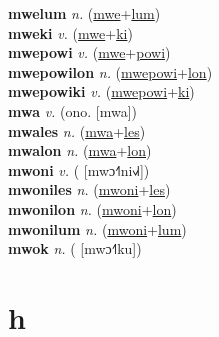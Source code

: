 \textbf{mwelum} \textit{n.} (\hyperref[mwe]{mwe}+\hyperref[lum]{lum})
 \label{mwelum} \\
\textbf{mweki} \textit{v.} (\hyperref[mwe]{mwe}+\hyperref[ki]{ki})
 \label{mweki} \\
\textbf{mwepowi} \textit{v.} (\hyperref[mwe]{mwe}+\hyperref[powi]{powi})
 \label{mwepowi} \\
\textbf{mwepowilon} \textit{n.} (\hyperref[mwepowi]{mwepowi}+\hyperref[lon]{lon})
 \label{mwepowilon} \\
\textbf{mwepowiki} \textit{v.} (\hyperref[mwepowi]{mwepowi}+\hyperref[ki]{ki})
 \label{mwepowiki} \\
\textbf{mwa} \textit{v.} (ono. [mwa])
 \label{mwa} \\
\textbf{mwales} \textit{n.} (\hyperref[mwa]{mwa}+\hyperref[les]{les})
 \label{mwales} \\
\textbf{mwalon} \textit{n.} (\hyperref[mwa]{mwa}+\hyperref[lon]{lon})
 \label{mwalon} \\
\textbf{mwoni} \textit{v.} ( [mwɔ˧˥ni˧˩˧])
 \label{mwoni} \\
\textbf{mwoniles} \textit{n.} (\hyperref[mwoni]{mwoni}+\hyperref[les]{les})
 \label{mwoniles} \\
\textbf{mwonilon} \textit{n.} (\hyperref[mwoni]{mwoni}+\hyperref[lon]{lon})
 \label{mwonilon} \\
\textbf{mwonilum} \textit{n.} (\hyperref[mwoni]{mwoni}+\hyperref[lum]{lum})
 \label{mwonilum} \\
\textbf{mwok} \textit{n.} ( [mwɔ˧˥ku])
 \label{mwok} 

\section{h}

